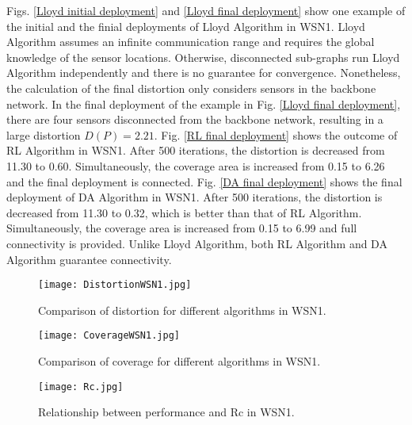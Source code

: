 \documentclass[journal,draftcls,onecolumn,12pt,twoside, narroweqnarray]{IEEEtran}
\begin{document}
Figs. \ref{Lloyd initial deployment} and \ref{Lloyd final deployment} show one example of the initial and the finial deployments of Lloyd Algorithm in WSN1. Lloyd Algorithm assumes an  infinite communication range and requires the global knowledge of the sensor locations. Otherwise, disconnected sub-graphs run Lloyd Algorithm independently and there is no guarantee for convergence. Nonetheless, the calculation of the final distortion only considers sensors in the backbone network. In the final deployment of the example in Fig. \ref{Lloyd final deployment}, there are four sensors disconnected from the backbone network, resulting in a large distortion $D(P)=2.21$.
Fig. \ref{RL final deployment} shows the outcome of RL Algorithm in WSN1. After 500 iterations, the distortion is decreased from 11.30 to 0.60. Simultaneously, the coverage area is increased from 0.15 to 6.26 and the final deployment is connected.
Fig. \ref{DA final deployment} shows the final deployment of DA Algorithm in WSN1. After 500 iterations, the distortion is decreased from 11.30 to 0.32, which is better than that of RL Algorithm. Simultaneously, the coverage area is increased from 0.15 to 6.99 and full connectivity is provided. Unlike Lloyd Algorithm, both RL Algorithm and DA Algorithm guarantee connectivity.

\begin{figure}[!t]
\centering
\texttt{[image: DistortionWSN1.jpg]}
\caption{Comparison of distortion for different algorithms in WSN1.}
\label{distortion in homogeneous sensor network}
\end{figure}
\begin{figure}[!t]
\centering
\texttt{[image: CoverageWSN1.jpg]}
\caption{Comparison of coverage for different algorithms in WSN1.}
\label{coverage in homogeneous sensor network}
\end{figure}


\begin{figure}[!t]
\centering
\texttt{[image: Rc.jpg]}
\setlength{\belowcaptionskip}{-10pt} \caption{Relationship between performance and Rc in WSN1.}
\label{relationship between distortion, coverage and Rc}
\end{figure}
\end{document}
